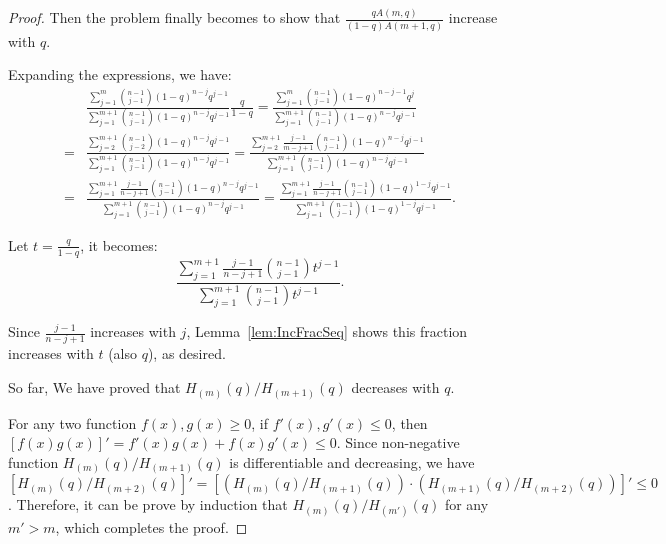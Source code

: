 \begin{proof}
    Then the problem finally becomes to show that $\frac{qA(m,q)}{(1-q)A(m+1,q)}$ increase with $q$. 

    Expanding the expressions, we have:
    \[
    \begin{aligned}
        & \frac{\sum_{j=1}^m\binom{n-1}{j-1}(1-q)^{n-j}q^{j-1}}{\sum_{j=1}^{m+1}\binom{n-1}{j-1}(1-q)^{n-j}q^{j-1}} \frac{q}{1-q} = \frac{\sum_{j=1}^m\binom{n-1}{j-1}(1-q)^{n-j-1}q^{j}}{\sum_{j=1}^{m+1}\binom{n-1}{j-1}(1-q)^{n-j}q^{j-1}} \\
    =& \frac{\sum_{j=2}^{m+1}\binom{n-1}{j-2}(1-q)^{n-j}q^{j-1}}{\sum_{j=1}^{m+1}\binom{n-1}{j-1}(1-q)^{n-j}q^{j-1}} = \frac{\sum_{j=2}^{m+1}\frac{j-1}{m-j+1}\binom{n-1}{j-1}(1-q)^{n-j}q^{j-1}}{\sum_{j=1}^{m+1}\binom{n-1}{j-1}(1-q)^{n-j}q^{j-1}} \\
    = & \frac{\sum_{j=1}^{m+1}\frac{j-1}{n-j+1}\binom{n-1}{j-1}(1-q)^{n-j}q^{j-1}}{\sum_{j=1}^{m+1}\binom{n-1}{j-1}(1-q)^{n-j}q^{j-1}} = \frac{\sum_{j=1}^{m+1}\frac{j-1}{n-j+1}\binom{n-1}{j-1}(1-q)^{1-j}q^{j-1}}{\sum_{j=1}^{m+1}\binom{n-1}{j-1}(1-q)^{1-j}q^{j-1}}.
    \end{aligned}
    \]

    Let $t=\frac{q}{1-q}$, it becomes:
    \[
    \frac{\sum_{j=1}^{m+1}\frac{j-1}{n-j+1}\binom{n-1}{j-1}t^{j-1}}{\sum_{j=1}^{m+1}\binom{n-1}{j-1}t^{j-1}}.
    \]

    Since $\frac{j-1}{n-j+1}$ increases with $j$, Lemma~\ref{lem:IncFracSeq} shows this fraction increases with $t$ (also $q$), as desired.

    So far, We have proved that $H_{(m)}(q)/H_{(m+1)}(q)$ decreases with $q$. 
    
    For any two function $f(x), g(x) \geq 0$, if $f'(x), g'(x) \leq 0 $, then $[f(x)g(x)]' = f'(x)g(x)+f(x)g'(x) \leq0$. Since non-negative function $H_{(m)}(q)/H_{(m+1)}(q)$ is differentiable and decreasing, we have $[H_{(m)}(q)/H_{(m+2)}(q)]'=[(H_{(m)}(q)/H_{(m+1)}(q))\cdot (H_{(m+1)}(q)/H_{(m+2)}(q))]'\leq0$. Therefore, it can be prove by induction that $H_{(m)}(q)/H_{(m')}(q)$ for any $m'>m$, which completes the proof.
\end{proof}

